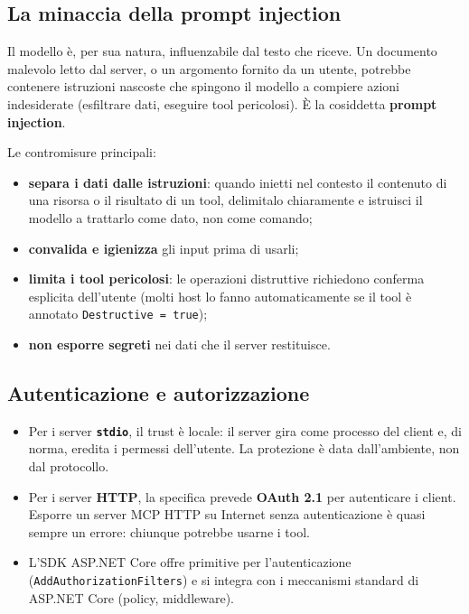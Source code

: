 \documentclass[
  italian,
  10pt,
]{book}
\providecommand{\tightlist}{%
  \setlength{\itemsep}{0pt}\setlength{\parskip}{0pt}}
\begin{document}
\subsection{La minaccia della prompt
injection}\label{la-minaccia-della-prompt-injection}

Il modello è, per sua natura, influenzabile dal testo che riceve. Un
documento malevolo letto dal server, o un argomento fornito da un
utente, potrebbe contenere istruzioni nascoste che spingono il modello a
compiere azioni indesiderate (esfiltrare dati, eseguire tool
pericolosi). È la cosiddetta \textbf{prompt injection}.

Le contromisure principali:

\begin{itemize}
\tightlist
\item
  \textbf{separa i dati dalle istruzioni}: quando inietti nel contesto
  il contenuto di una risorsa o il risultato di un tool, delimitalo
  chiaramente e istruisci il modello a trattarlo come dato, non come
  comando;
\item
  \textbf{convalida e igienizza} gli input prima di usarli;
\item
  \textbf{limita i tool pericolosi}: le operazioni distruttive
  richiedono conferma esplicita dell'utente (molti host lo fanno
  automaticamente se il tool è annotato \texttt{Destructive\ =\ true});
\item
  \textbf{non esporre segreti} nei dati che il server restituisce.
\end{itemize}

\subsection{Autenticazione e
autorizzazione}\label{autenticazione-e-autorizzazione}

\begin{itemize}
\tightlist
\item
  Per i server \textbf{\texttt{stdio}}, il trust è locale: il server
  gira come processo del client e, di norma, eredita i permessi
  dell'utente. La protezione è data dall'ambiente, non dal protocollo.
\item
  Per i server \textbf{HTTP}, la specifica prevede \textbf{OAuth 2.1}
  per autenticare i client. Esporre un server MCP HTTP su Internet senza
  autenticazione è quasi sempre un errore: chiunque potrebbe usarne i
  tool.
\item
  L'SDK ASP.NET Core offre primitive per l'autenticazione
  (\texttt{AddAuthorizationFilters}) e si integra con i meccanismi
  standard di ASP.NET Core (policy, middleware).
\end{itemize}
\end{document}
